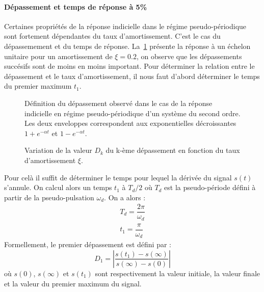\paragraph{Dépassement et temps de réponse à 5\%}
Certaines propriétés de la réponse indicielle dans le régime pseudo-périodique 
sont fortement dépendantes du taux d'amortissement. C'est le cas du 
dépassemement et du temps de réponse. La~\cref{fig-2nd_depassement_1} présente 
la réponse à un échelon unitaire pour un amortissement de $\xi=0.2$, 
on observe que les dépassements succésifs sont de moins en moins important. 
Pour déterminer la relation entre le dépassement et le taux d'amortissement, 
il nous faut d'abord déterminer le temps du premier maximum $t_1$.
\begin{figure}[!h]
    \centering
    
    \caption{Définition du dépassement observé dans le cas de la réponse 
             indicielle en régime pseudo-périodique d'un système du second 
             ordre. Les deux enveloppes correspondent aux exponentielles 
             décroissantes $1+e^{-\alpha t}$ et $1-e^{-\alpha t}$. 
             \label{fig-2nd_depassement_1}}
\end{figure}
\begin{figure}[!h]
    \centering
    
    \caption{Variation de la valeur $D_k$ du k-ème dépassement en fonction 
             du taux d'amortissement $\xi$. \label{fig-2nd_depassement_2}}
\end{figure}
Pour celà il suffit de déterminer le temps pour lequel la dérivée 
du signal $s(t)$ s'annule. On calcul alors un temps $t_1$ à $T_d/2$ 
où $T_d$ est la pseudo-période défini à partir de la 
pseudo-pulsation $\omega_d$. 
On a alors :
\begin{align*}
T_d=\dfrac{2\pi}{\omega_d}\\
t_1 = \dfrac{\pi}{\omega_d}
\end{align*}
Formellement, le premier dépassement est défini par :
\[
D_1=\left|\dfrac{s(t_1)-s(\infty)}{s(\infty)-s(0)}\right|
\]
où $s(0)$, $s(\infty)$ et $s(t_1)$ sont respectivement la valeur initiale, 
la valeur finale et la valeur du premier maximum du signal.


